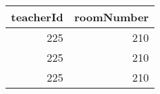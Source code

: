 \begin{tabular}{rr}
\toprule
teacherId & roomNumber \\
\midrule
225 & 210 \\
225 & 210 \\
225 & 210 \\
\bottomrule
\end{tabular}

